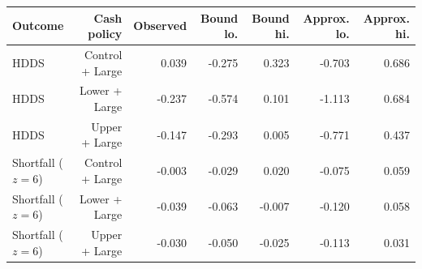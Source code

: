 \begin{tabular}{lrrrrrr}
\toprule
Outcome & Cash policy & Observed & Bound lo. & Bound hi. & Approx. lo. & Approx. hi. \\
\midrule
HDDS & Control + Large & 0.039 & -0.275 & 0.323 & -0.703 & 0.686 \\
HDDS & Lower + Large & -0.237 & -0.574 & 0.101 & -1.113 & 0.684 \\
HDDS & Upper + Large & -0.147 & -0.293 & 0.005 & -0.771 & 0.437 \\
Shortfall ($z=6$) & Control + Large & -0.003 & -0.029 & 0.020 & -0.075 & 0.059 \\
Shortfall ($z=6$) & Lower + Large & -0.039 & -0.063 & -0.007 & -0.120 & 0.058 \\
Shortfall ($z=6$) & Upper + Large & -0.030 & -0.050 & -0.025 & -0.113 & 0.031 \\
\bottomrule
\end{tabular}
